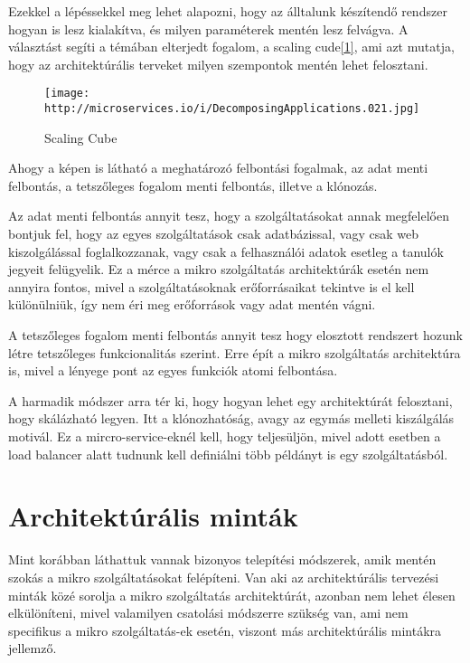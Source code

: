 \documentclass[11pt,magyar,a4paper,oneside,]{report}
\let\Oldincludegraphics\includegraphics
\renewcommand{\includegraphics}[1]{
\begin{adjustbox}{max size={\textwidth}{\textheight}}
    \Oldincludegraphics[scale=0.6]{#1}%
\end{adjustbox}
}
\begin{document}
Ezekkel a lépéssekkel meg lehet alapozni, hogy az álltalunk készítendő
rendszer hogyan is lesz kialakítva, és milyen paraméterek mentén lesz
felvágva. A választást segíti a témában elterjedt fogalom, a scaling
cude\href{http://microservices.io/articles/scalecube.html}{{[}1{]}}, ami
azt mutatja, hogy az architektúrális terveket milyen szempontok mentén
lehet felosztani.

\begin{figure}[htbp]
\centering
\texttt{[image: http://microservices.io/i/DecomposingApplications.021.jpg]}
\caption{Scaling Cube}
\end{figure}

Ahogy a képen is látható a meghatározó felbontási fogalmak, az adat
menti felbontás, a tetszőleges fogalom menti felbontás, illetve a
klónozás.

Az adat menti felbontás annyit tesz, hogy a szolgáltatásokat annak
megfelelően bontjuk fel, hogy az egyes szolgáltatások csak adatbázissal,
vagy csak web kiszolgálással foglalkozzanak, vagy csak a felhasználói
adatok esetleg a tanulók jegyeit felügyelik. Ez a mérce a mikro
szolgáltatás architektúrák esetén nem annyira fontos, mivel a
szolgáltatásoknak erőforrásaikat tekintve is el kell különülniük, így
nem éri meg erőforrások vagy adat mentén vágni.

A tetszőleges fogalom menti felbontás annyit tesz hogy elosztott
rendszert hozunk létre tetszőleges funkcionalitás szerint. Erre épít a
mikro szolgáltatás architektúra is, mivel a lényege pont az egyes
funkciók atomi felbontása.

A harmadik módszer arra tér ki, hogy hogyan lehet egy architektúrát
felosztani, hogy skálázható legyen. Itt a klónozhatóság, avagy az egymás
melleti kiszálgálás motivál. Ez a mircro-service-eknél kell, hogy
teljesüljön, mivel adott esetben a load balancer alatt tudnunk kell
definiálni több példányt is egy szolgáltatásból.

\section{Architektúrális minták}\label{architektuxfaruxe1lis-mintuxe1k}

Mint korábban láthattuk vannak bizonyos telepítési módszerek, amik
mentén szokás a mikro szolgáltatásokat felépíteni. Van aki az
architektúrális tervezési minták közé sorolja a mikro szolgáltatás
architektúrát, azonban nem lehet élesen elkülöníteni, mivel valamilyen
csatolási módszerre szükség van, ami nem specifikus a mikro
szolgáltatás-ek esetén, viszont más architektúrális mintákra jellemző.
\end{document}

